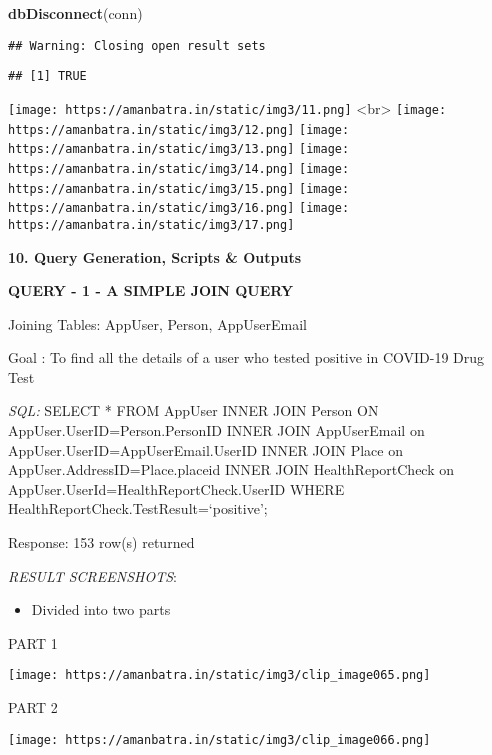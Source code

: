 \documentclass[
]{article}
\newenvironment{Shaded}{\begin{snugshade}}{\end{snugshade}}
\newcommand{\KeywordTok}[1]{\textcolor[rgb]{0.13,0.29,0.53}{\textbf{#1}}}
\newcommand{\NormalTok}[1]{#1}
\providecommand{\tightlist}{%
  \setlength{\itemsep}{0pt}\setlength{\parskip}{0pt}}
\begin{document}
\begin{Shaded}
\begin{Highlighting}[]
\KeywordTok{dbDisconnect}\NormalTok{(conn)}
\end{Highlighting}
\end{Shaded}

\begin{verbatim}
## Warning: Closing open result sets
\end{verbatim}

\begin{verbatim}
## [1] TRUE
\end{verbatim}

\texttt{[image: https://amanbatra.in/static/img3/11.png]}
\textless br\textgreater{}
\texttt{[image: https://amanbatra.in/static/img3/12.png]}
\texttt{[image: https://amanbatra.in/static/img3/13.png]}
\texttt{[image: https://amanbatra.in/static/img3/14.png]}
\texttt{[image: https://amanbatra.in/static/img3/15.png]}
\texttt{[image: https://amanbatra.in/static/img3/16.png]}
\texttt{[image: https://amanbatra.in/static/img3/17.png]}

\textbf{10. Query Generation, Scripts \& Outputs}

\textbf{QUERY - 1 - A SIMPLE JOIN QUERY}

Joining Tables: AppUser, Person, AppUserEmail

Goal : To find all the details of a user who tested positive in COVID-19
Drug Test

\emph{SQL:} SELECT * FROM AppUser INNER JOIN Person ON
AppUser.UserID=Person.PersonID INNER JOIN AppUserEmail on
AppUser.UserID=AppUserEmail.UserID INNER JOIN Place on
AppUser.AddressID=Place.placeid INNER JOIN HealthReportCheck on
AppUser.UserId=HealthReportCheck.UserID WHERE
HealthReportCheck.TestResult=`positive';

Response: 153 row(s) returned

\emph{RESULT SCREENSHOTS}:

\begin{itemize}
\tightlist
\item
  Divided into two parts
\end{itemize}

PART 1

\texttt{[image: https://amanbatra.in/static/img3/clip\_image065.png]}

PART 2

\texttt{[image: https://amanbatra.in/static/img3/clip\_image066.png]}
\end{document}
